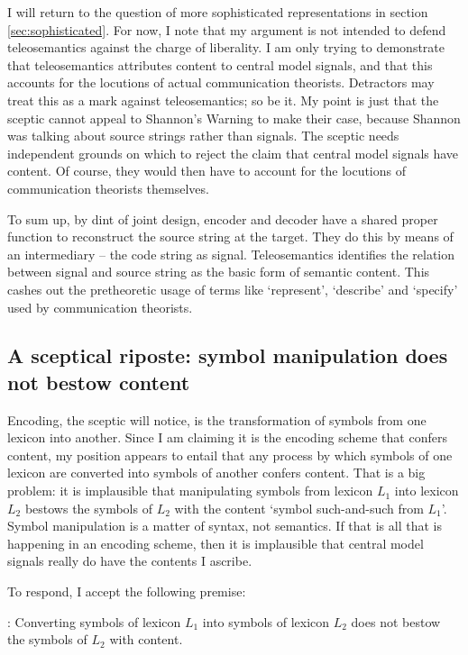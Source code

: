 \documentclass[12pt]{article}
\begin{document}
I will return to the question of more sophisticated representations in section \ref{sec:sophisticated}.
For now, I note that my argument is not intended to defend teleosemantics against the charge of liberality.
I am only trying to demonstrate that teleosemantics attributes content to central model signals, and that this accounts for the locutions of actual communication theorists.
Detractors may treat this as a mark against teleosemantics; so be it.
My point is just that the sceptic cannot appeal to {\sc Shannon's Warning} to make their case, because Shannon was talking about source strings rather than signals.
The sceptic needs independent grounds on which to reject the claim that central model signals have content.
Of course, they would then have to account for the locutions of communication theorists themselves.

To sum up, by dint of joint design, encoder and decoder have a shared proper function to reconstruct the source string at the target.
They do this by means of an intermediary -- the code string as signal.
Teleosemantics identifies the relation between signal and source string as the basic form of semantic content.
This cashes out the pretheoretic usage of terms like `represent', `describe' and `specify' used by communication theorists.

\subsection{A sceptical riposte: symbol manipulation does not bestow content}

Encoding, the sceptic will notice, is the transformation of symbols from one lexicon into another.
Since I am claiming it is the encoding scheme that confers content, my position appears to entail that any process by which symbols of one lexicon are converted into symbols of another confers content.
That is a big problem: it is implausible that manipulating symbols from lexicon $L_1$ into lexicon $L_2$ bestows the symbols of $L_2$ with the content `symbol such-and-such from $L_1$'.
Symbol manipulation is a matter of syntax, not semantics.
If that is all that is happening in an encoding scheme, then it is implausible that central model signals really do have the contents I ascribe.

To respond, I accept the following premise:

\begin{myquote}
\smi{}: Converting symbols of lexicon $L_1$ into symbols of lexicon $L_2$ does not bestow the symbols of $L_2$ with content.
\end{myquote}
\end{document}
